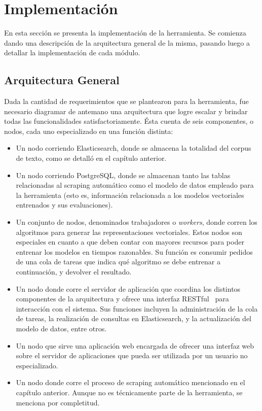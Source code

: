\section{Implementación}

En esta sección se presenta la implementación de la herramienta. Se comienza dando una descripción
de la arquitectura general de la misma, pasando luego a detallar la implementación de cada
módulo.


\subsection{Arquitectura General}

Dada la cantidad de requerimientos que se plantearon para la herramienta, fue necesario diagramar de
antemano una arquitectura que logre escalar y brindar todas las funcionalidades
satisfactoriamente. Ésta cuenta de seis componentes, o nodos, cada uno especializado en una función
distinta:

\begin{itemize}

\item Un nodo corriendo Elasticsearch, donde se almacena la totalidad del corpus de texto, como se
detalló en el capítulo anterior.

\item Un nodo corriendo PostgreSQL, donde se almacenan tanto las tablas relacionadas al scraping
automático como el modelo de datos empleado para la herramienta (esto es, información relacionada a
los modelos vectoriales entrenados y sus evaluaciones).

\item Un conjunto de nodos, denominados trabajadores o \textit{workers}, donde corren los algoritmos
para generar las representaciones vectoriales. Estos nodos son especiales en cuanto a que deben
contar con mayores recursos para poder entrenar los modelos en tiempos razonables. Su función es
consumir pedidos de una cola de tareas que indica qué algoritmo se debe entrenar a continuación, y
devolver el resultado.

\item Un nodo donde corre el servidor de aplicación que coordina los distintos componentes de la
arquitectura y ofrece una interfaz RESTful~\cite{Fielding2000} para interacción con el sistema. Sus
funciones incluyen la administración de la cola de tareas, la realización de consultas en Elasticsearch,
y la actualización del modelo de datos, entre otros.

\item Un nodo que sirve una aplicación web encargada de ofrecer una interfaz web sobre el servidor
de aplicaciones que pueda ser utilizada por un usuario no especializado.

\item Un nodo donde corre el proceso de scraping automático mencionado en el capítulo
anterior. Aunque no es técnicamente parte de la herramienta, se menciona por completitud.

\end{itemize}


